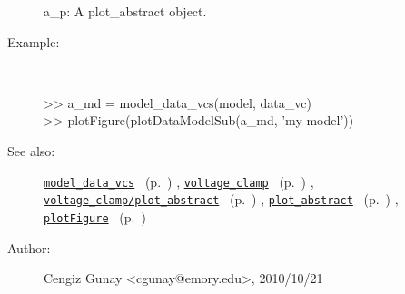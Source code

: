 \begin{description}
   a\_p: A plot\_abstract object.
%
\item[Example:]~
\begin{lyxcode} >> a\_md = model\_data\_vcs(model, data\_vc)
\\%
 >> plotFigure(plotDataModelSub(a\_md, 'my model'))
\\%
\end{lyxcode}
%
\item[See also:]%
\hyperlink{ref_model_data_vcs}{\texttt{model\_data\_vcs}}%
\ (p.~\pageref{ref_model_data_vcs})%
%
, \hyperlink{ref_voltage_clamp}{\texttt{voltage\_clamp}}%
\ (p.~\pageref{ref_voltage_clamp})%
%
, \hyperlink{ref_voltage_clamp__plot_abstract}{\texttt{voltage\_clamp/plot\_abstract}}%
\ (p.~\pageref{ref_voltage_clamp__plot_abstract})%
%
, \hyperlink{ref_plot_abstract}{\texttt{plot\_abstract}}%
\ (p.~\pageref{ref_plot_abstract})%
%
, \hyperlink{ref_plotFigure}{\texttt{plotFigure}}%
\ (p.~\pageref{ref_plotFigure})%
%
%
\item[Author:]%
Cengiz Gunay <cgunay@emory.edu>, 2010/10/21
%
\end{description}
\methodline%
